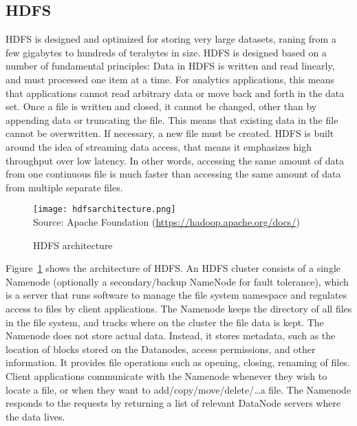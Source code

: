 \subsection{HDFS}

HDFS is designed and optimized for storing very large datasets, raning from a few gigabytes to hundreds of terabytes in size. HDFS is designed based on a number of fundamental principles: Data in HDFS is written and read linearly, and must processed one item at a time. For analytics applications, this means that applications cannot read arbitrary data or move back and forth in the data set. Once a file is written and closed, it cannot be changed, other than by appending data or truncating the file. This means that existing data in the file cannot be overwritten. If necessary, a new file must be created. HDFS is built around the idea of streaming data access, that means it emphasizes high throughput over low latency. In other words, accessing the same amount of data from one continuous file is much faster than accessing the same amount of data from multiple separate files. 

\begin{figure}
\centering

\texttt{[image: hdfsarchitecture.png]} \\

\scriptsize Source: Apache Foundation (\url{https://hadoop.apache.org/docs/})
\caption{HDFS architecture}
\label{fig:hdfsarchitecture}
\end{figure}

Figure~\ref{fig:hdfsarchitecture} shows the architecture of HDFS. An HDFS cluster consists of a single Namenode (optionally a secondary/backup NameNode for fault tolerance), which is a server that runs software to manage the file system namespace and regulates access to files by client applications. The Namenode keeps the directory of all files in the file system, and tracks where on the cluster the file data is kept. The Namenode does not store actual data. Instead, it stores metadata, such as the location of blocks stored on the Datanodes, access permissions, and other information. It provides file operations such as opening, closing, renaming of files. Client applications communicate with the Namenode whenever they wish to locate a file, or when they want to add/copy/move/delete/\ldots a file. The Namenode responds to the requests by returning a list of relevant DataNode servers where the data lives.

